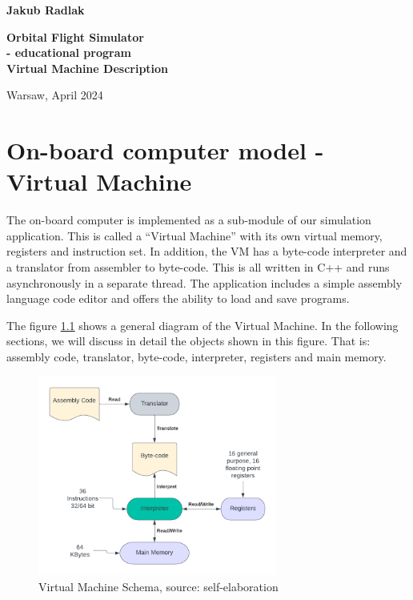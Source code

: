 \documentclass[oneside]{book}
\begin{document}
\newtheorem{twr}{Twierdzenie}

\vspace{1cm}
\begin{center}
    \large
   	\textbf{Jakub Radlak}
\end{center}

\vspace{1.5cm}
\begin{center}
    \Large{\textbf{Orbital Flight Simulator \\ 
    - educational program \\
    Virtual Machine Description}}

\end{center}

\vspace{3.2cm}
\begin{center}
\large
Warsaw, April 2024
\end{center}

\newpage

\tableofcontents

\pagestyle{plain}

\chapter{On-board computer model - Virtual Machine}

The on-board computer is implemented as a sub-module of our simulation application. This is called a ``Virtual Machine'' with its own virtual memory, registers and instruction set. In addition, the VM has a byte-code interpreter and a translator from assembler to byte-code. This is all written in C++ and runs asynchronously in a separate thread. The application includes a simple assembly language code editor and offers the ability to load and save programs.

The figure \ref{fig:vm_schema} shows a general diagram of the Virtual Machine. In the following sections, we will discuss in detail the objects shown in this figure. That is: assembly code, translator, byte-code, interpreter, registers and main memory.

\begin{figure}[H]
    \centering
    \includegraphics[width=0.7\textwidth]{Images/VMSchema2.png}
    \caption{Virtual Machine Schema, source: self-elaboration}
    \label{fig:vm_schema}
\end{figure}
\end{document}
